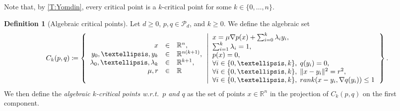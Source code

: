 \documentclass{amsart}
\newcommand{\R}{\mathbb{R}}
\newcommand{\Poly}{\mathscr{P}}
\theoremstyle{definition}
\newtheorem{definition}[subsubsection]{Definition}
\theoremstyle{remark}
\begin{document}
Note that, by \cref{T:Yomdin}, every critical point is a $k$-critical point for some $k \in \{0, \ldots, n\}$.

\begin{definition}[Algebraic critical points]
\label{D:algebraic-critical-points}
Let $d \geq 0$, $p, q \in \Poly_d$, and $k \geq 0$. We define the algebraic set
\[
C_k(p, q) \coloneqq \left\{
\begin{array}{rcl}
x & \in & \R^n, \\
y_0, \ldots, y_k & \in & \R^{n(k + 1)}, \\
\lambda_0, \ldots, \lambda_k & \in & \R^{k + 1}, \\
\mu, r & \in & \R
\end{array}
\left|
\begin{array}{l}
x = \mu \nabla p(x) + \sum_{i = 0}^k \lambda_i y_i, \\
\sum_{i = 1}^k \lambda_i = 1, \\
p(x) = 0, \\
\forall i \in \{0, \ldots, k\}, \; q(y_i) = 0, \\
\forall i \in \{0, \ldots, k\}, \; \|x - y_i\|^2 = r^2, \\
\forall i \in \{0, \ldots, k\}, \; \textnormal{rank}(x - y_i, \nabla q(y_i)) \leq 1
\end{array}
\right.
\right\}.
\]
We then define the \emph{algebraic $k$-critical points w.r.t.\ $p$ and $q$} as the set of points $x \in \R^n$ in the projection of $C_k(p, q)$ on the first component.
\end{definition}
\end{document}
